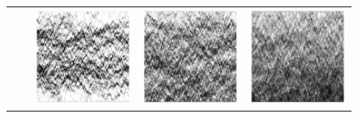 \begin{figure}
\begin{center}
\begin{tabular}{c @{\hskip -0.5em} c| c @{\hskip -0.5em} c @{\hskip -0.5em} c}
\raisebox{5em}{1024} & & \includegraphics[width=0.31\linewidth]{numerics/images/stickyParticleFlows/flowImpL0p05T32p0.png} 
 & \includegraphics[width=0.31\linewidth]{numerics/images/stickyParticleFlows/flowImpL0p15T32p0.png}
 & \includegraphics[width=0.31\linewidth]{numerics/images/stickyParticleFlows/flowImpL0p35T32p0.png} \\ 
\end{tabular}
\end{center}
 \end{figure}
 
